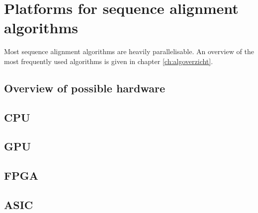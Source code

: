 
\chapter{Platforms for sequence alignment algorithms}

Most sequence alignment algorithms are heavily parallelisable. An overview of the most frequently used algorithms is given in chapter \ref{ch:algoverzicht}.

\section{Overview of possible hardware}

\section{CPU}
\section{GPU}
\section{FPGA}
\section{ASIC}


